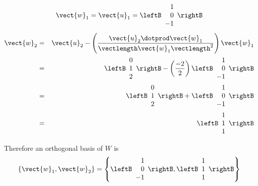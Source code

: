 \begin{solution}
\[
\vect{w}_1 = \vect{u}_1 = \leftB \begin{array}{r}
1 \\
0 \\
-1
\end{array}
\rightB
\]
\begin{eqnarray*}
\vect{w}_2 &=& \vect{u}_2 - \left(  \frac{ \vect{u}_2 \dotprod \vect{w}_1}{\vectlength \vect{w}_1 \vectlength^2} \right)  \vect{w}_1\\
&=& \leftB
\begin{array}{c}
0 \\
1 \\
2
\end{array}
\rightB
-
\left(
\frac{-2}{2}\right)
\leftB
\begin{array}{r}
1 \\
0 \\
-1
\end{array}
\rightB
\\
&=&
\leftB
\begin{array}{c}
0 \\
1 \\
2
\end{array}
\rightB 
+
\leftB
\begin{array}{r}
1 \\
0 \\
-1
\end{array}
\rightB \\
&=&
\leftB
\begin{array}{c}
1 \\
1 \\
1
\end{array}
\rightB
\end{eqnarray*}

Therefore an orthogonal basis of $W$ is 
\[
\left\{ \vect{w}_1, \vect{w}_2 \right\} = 
\left\{
\leftB \begin{array}{r}
1 \\
0 \\
-1
\end{array}
\rightB, 
\leftB
\begin{array}{c}
1 \\
1 \\
1
\end{array}
\rightB
\right\}
\]


\end{solution}
